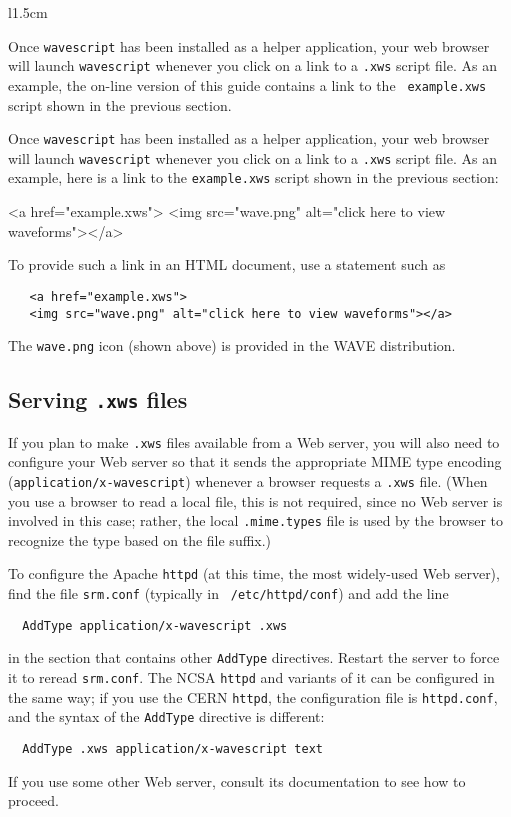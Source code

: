 \documentclass[twoside]{book}
\newcommand{\WAVE}{{\sf WAVE}\xspace}
\begin{document}
\begin{latexonly}
\begin{wrapfigure}[3]{l}{1.5cm}
\mbox{}
\end{wrapfigure}
Once {\tt wavescript} has been installed as a helper application, your
web browser will launch {\tt wavescript} whenever you click on a link
to a {\tt .xws} script file.  As an example, 
the on-line version of this guide contains a link to the {\tt
example.xws} script shown in the previous section.  
\end{latexonly}
\begin{htmlonly}
Once {\tt wavescript} has been installed as a helper application, your
web browser will launch {\tt wavescript} whenever you click on a link
to a {\tt .xws} script file.  As an example, 
here is a link to the {\tt example.xws} script shown in the previous
section:
\end{htmlonly}
\begin{rawhtml}
   <a href="example.xws">
   <img src="wave.png" alt="click here to view waveforms"></a>
\end{rawhtml}
To provide such a link in an HTML document, use a statement such as
\begin{verbatim}
   <a href="example.xws">
   <img src="wave.png" alt="click here to view waveforms"></a>
\end{verbatim}
\begin{latexonly}
The {\tt wave.png} icon (shown above) is provided in the \WAVE{}
distribution.
\end{latexonly}

\subsection*{Serving {\tt .xws} files}

If you plan to make {\tt .xws} files available from a Web server, you
will also need to configure your Web server so that it sends the
appropriate MIME type encoding ({\tt application/x-wavescript})
whenever a browser requests a {\tt .xws} file.  (When you use a
browser to read a local file, this is not required, since no Web
server is involved in this case; rather, the local {\tt .mime.types}
file is used by the browser to recognize the type based on the file
suffix.)

To configure the Apache {\tt httpd} (at this time, the most widely-used
Web server), find the file {\tt srm.conf} (typically in {\tt
/etc/httpd/conf}) and add the line
\begin{verbatim}
  AddType application/x-wavescript .xws
\end{verbatim}
in the section that contains other {\tt AddType} directives.  Restart
the server to force it to reread {\tt srm.conf}.  The NCSA {\tt httpd}
and variants of it can be configured in the same way;  if you use the
CERN {\tt httpd}, the configuration file is {\tt httpd.conf}, and the
syntax of the {\tt AddType} directive is different:
\begin{verbatim}
  AddType .xws application/x-wavescript text
\end{verbatim}
If you use some other Web server, consult its documentation to see how
to proceed.
\end{document}
